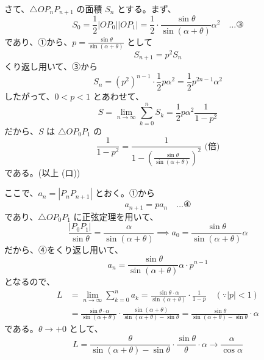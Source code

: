 \documentclass[../main.tex]{subfiles}
\begin{document}
\begin{center}
\end{center}

\noindent
さて、$\triangle O P_n P_{n+1}$ の面積 $S_n$ とする。まず、
\[
  S_0 = \frac{1}{2} |O P_0| |O P_1| = \frac{1}{2} \cdot \frac{\sin \theta}{\sin(\alpha+\theta)} \alpha^2 \quad \dots \text{③}
\]
であり、①から、$p = \frac{\sin \theta}{\sin(\alpha+\theta)}$ として
\[
  S_{n+1} = p^2 S_n
\]
くり返し用いて、③から
\[
  S_n = (p^2)^{n-1} \cdot \frac{1}{2} p \alpha^2 = \frac{1}{2} p^{2n-1} \alpha^2
\]
したがって、$0 < p < 1$ とあわせて、
\[
  S = \lim_{n \to \infty} \sum_{k=0}^n S_k = \frac{1}{2} p \alpha^2 \frac{1}{1-p^2}
\]
だから、$S$ は $\triangle O P_0 P_1$ の
\[
  \frac{1}{1-p^2} = \frac{1}{1 - \left( \frac{\sin \theta}{\sin(\alpha+\theta)} \right)^2} \text{ (倍)}
\]
である。(以上 (ロ))

\vspace{0.5cm}

\noindent
ここで、$a_n = |P_n P_{n+1}|$ とおく。①から
\[
  a_{n+1} = p a_n \quad \dots \text{④}
\]
であり、$\triangle O P_0 P_1$ に正弦定理を用いて、
\[
  \frac{|P_0 P_1|}{\sin \theta} = \frac{\alpha}{\sin(\alpha+\theta)} \implies a_0 = \frac{\sin \theta}{\sin(\alpha+\theta)} \alpha
\]
だから、④をくり返し用いて、
\[
  a_n = \frac{\sin \theta}{\sin(\alpha+\theta)} \alpha \cdot p^{n-1}
\]
となるので、
\begin{align*}
  L &= \lim_{n \to \infty} \sum_{k=0}^n a_k = \frac{\sin \theta \cdot \alpha}{\sin(\alpha+\theta)} \cdot \frac{1}{1-p} \quad (\because |p| < 1) \\
  &= \frac{\sin \theta \cdot \alpha}{\sin(\alpha+\theta)} \cdot \frac{\sin(\alpha+\theta)}{\sin(\alpha+\theta) - \sin \theta} = \frac{\sin \theta}{\sin(\alpha+\theta) - \sin \theta} \cdot \alpha
\end{align*}
である。$\theta \to +0$ として、
\[
  L = \frac{\theta}{\sin(\alpha+\theta) - \sin \theta} \cdot \frac{\sin \theta}{\theta} \cdot \alpha \longrightarrow \frac{\alpha}{\cos \alpha}
\]
\end{document}
